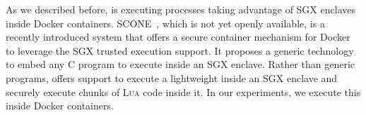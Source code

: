 \sloppy %
As we described before, \SYS{} is executing processes taking advantage of SGX enclaves inside Docker containers.
\textsc{SCONE}~\cite{pietzuch_scone:_nodate}, which is not yet openly available, is a recently introduced system that offers a secure container mechanism for Docker to leverage the SGX trusted execution support.
It proposes a generic technology to embed any C program to execute inside an SGX enclave.
Rather than generic programs, \SYS{} offers support to execute a lightweight \luavm{} inside an SGX enclave and securely execute chunks of \textsc{Lua} code inside it.
In our experiments, we execute this \luavm{} inside Docker containers.
